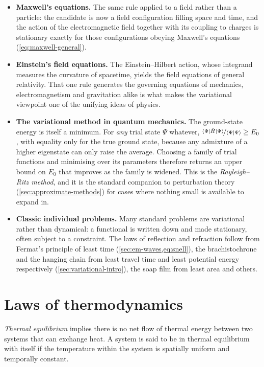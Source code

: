 \begin{itemize}
            \item \textbf{Maxwell's equations.} The same rule applied to a field rather than a particle: the candidate is now a field configuration filling space and time, and the action of the electromagnetic field together with its coupling to charges is stationary exactly for those configurations obeying Maxwell's equations (\cref{eq:maxwell-general}).
            \item \textbf{Einstein's field equations.} The Einstein--Hilbert action, whose integrand measures the curvature of spacetime, yields the field equations of general relativity. That one rule generates the governing equations of mechanics, electromagnetism and gravitation alike is what makes the variational viewpoint one of the unifying ideas of physics.
            \item \textbf{The variational method in quantum mechanics.} The ground-state energy is itself a minimum. For \emph{any} trial state $\Psi$ whatever, $\nicefrac{\bra{\Psi}\hat{H}\ket{\Psi}}{\braket{\Psi|\Psi}} \geq E_{0}$, with equality only for the true ground state, because any admixture of a higher eigenstate can only raise the average. Choosing a family of trial functions and minimising over its parameters therefore returns an upper bound on $E_{0}$ that improves as the family is widened. This is the \emph{Rayleigh--Ritz method}, and it is the standard companion to perturbation theory (\cref{sec:approximate-methods}) for cases where nothing small is available to expand in.
            \item \textbf{Classic individual problems.} Many standard problems are variational rather than dynamical: a functional is written down and made stationary, often subject to a constraint. The laws of reflection and refraction follow from Fermat's principle of least time (\cref{sec:em-waves,eq:snell}), the brachistochrone and the hanging chain from least travel time and least potential energy respectively (\cref{sec:variational-intro}), the soap film from least area and others.
        \end{itemize}

\section{Laws of thermodynamics}
\label{sec:thermodynamics}

    \emph{Thermal equilibrium} implies there is no net flow of thermal energy between two systems that can exchange heat. A system is said to be in thermal equilibrium with itself if the temperature within the system is spatially uniform and temporally constant.

